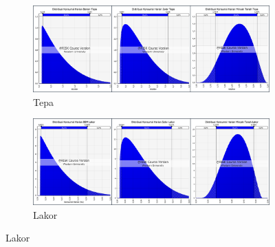 \begin{figure}[htbp]
    \centering
    \begin{subfigure}[b]{0.48\textwidth}
        \centering
        \includegraphics[width=\textwidth]{gambar/cons-bbm-tepa.png}
        \caption{Tepa}
        \label{fig:cons-bbm-tepa}
    \end{subfigure}
    \hfill
    \begin{subfigure}[b]{0.48\textwidth}
        \centering
        \includegraphics[width=\textwidth]{gambar/cons-bbm-lakor.png}
        \caption{Lakor}
        \label{fig:cons-bbm-lakor}
    \end{subfigure}
    
    \vspace{1em}
    

\end{figure}
